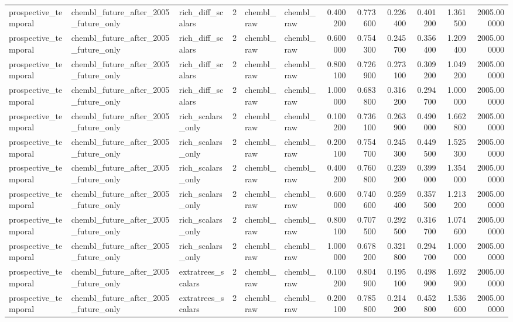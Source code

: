 \begin{longtable}{lllrllrrrrrr}
prospective\_temporal & chembl\_future\_after\_2005\_future\_only & rich\_diff\_scalars & 2 & chembl\_raw & chembl\_raw & 0.400200 & 0.773600 & 0.226400 & 0.401200 & 1.361500 & 2005.000000 \\
prospective\_temporal & chembl\_future\_after\_2005\_future\_only & rich\_diff\_scalars & 2 & chembl\_raw & chembl\_raw & 0.600000 & 0.754300 & 0.245700 & 0.356400 & 1.209400 & 2005.000000 \\
prospective\_temporal & chembl\_future\_after\_2005\_future\_only & rich\_diff\_scalars & 2 & chembl\_raw & chembl\_raw & 0.800100 & 0.726900 & 0.273100 & 0.309200 & 1.049200 & 2005.000000 \\
prospective\_temporal & chembl\_future\_after\_2005\_future\_only & rich\_diff\_scalars & 2 & chembl\_raw & chembl\_raw & 1.000000 & 0.683800 & 0.316200 & 0.294700 & 1.000000 & 2005.000000 \\
prospective\_temporal & chembl\_future\_after\_2005\_future\_only & rich\_scalars\_only & 2 & chembl\_raw & chembl\_raw & 0.100200 & 0.736100 & 0.263900 & 0.490000 & 1.662800 & 2005.000000 \\
prospective\_temporal & chembl\_future\_after\_2005\_future\_only & rich\_scalars\_only & 2 & chembl\_raw & chembl\_raw & 0.200100 & 0.754700 & 0.245300 & 0.449500 & 1.525300 & 2005.000000 \\
prospective\_temporal & chembl\_future\_after\_2005\_future\_only & rich\_scalars\_only & 2 & chembl\_raw & chembl\_raw & 0.400200 & 0.760800 & 0.239200 & 0.399000 & 1.354000 & 2005.000000 \\
prospective\_temporal & chembl\_future\_after\_2005\_future\_only & rich\_scalars\_only & 2 & chembl\_raw & chembl\_raw & 0.600000 & 0.740600 & 0.259400 & 0.357500 & 1.213200 & 2005.000000 \\
prospective\_temporal & chembl\_future\_after\_2005\_future\_only & rich\_scalars\_only & 2 & chembl\_raw & chembl\_raw & 0.800100 & 0.707500 & 0.292500 & 0.316700 & 1.074600 & 2005.000000 \\
prospective\_temporal & chembl\_future\_after\_2005\_future\_only & rich\_scalars\_only & 2 & chembl\_raw & chembl\_raw & 1.000000 & 0.678200 & 0.321800 & 0.294700 & 1.000000 & 2005.000000 \\
prospective\_temporal & chembl\_future\_after\_2005\_future\_only & extratrees\_scalars & 2 & chembl\_raw & chembl\_raw & 0.100200 & 0.804900 & 0.195100 & 0.498900 & 1.692900 & 2005.000000 \\
prospective\_temporal & chembl\_future\_after\_2005\_future\_only & extratrees\_scalars & 2 & chembl\_raw & chembl\_raw & 0.200100 & 0.785800 & 0.214200 & 0.452800 & 1.536600 & 2005.000000 \\

\end{longtable}
